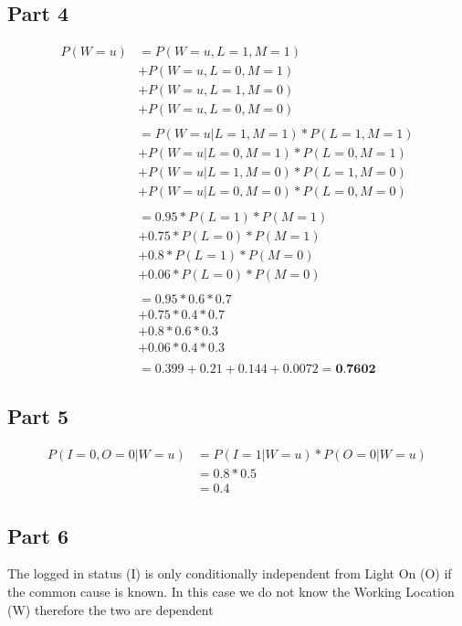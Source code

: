 \documentclass[a4paper, 12pt]{article}
\begin{document}
		\subsection{Part 4}
			\begin{equation*}
				\begin{split}
					P(W=u) & = P(W=u,L=1,M=1)
					\\
					& + P(W=u,L=0,M=1)
					\\
					& + P(W=u,L=1,M=0)
					\\
					& + P(W=u,L=0,M=0)
					\\\\
					& = P(W=u|L=1,M=1)*P(L=1,M=1)
					\\
					& + P(W=u|L=0,M=1)*P(L=0,M=1)
					\\
					& + P(W=u|L=1,M=0)*P(L=1,M=0)
					\\
					& + P(W=u|L=0,M=0)*P(L=0,M=0)
					\\\\
					& = 0.95 * P(L=1) * P(M=1)
					\\
					& + 0.75 * P(L=0) * P(M=1)
					\\
					& + 0.8 * P(L=1) * P(M=0)
					\\
					& + 0.06 * P(L=0) * P(M=0)
					\\\\
					& = 0.95 * 0.6 * 0.7
					\\
					& + 0.75 * 0.4 * 0.7
					\\
					& + 0.8 * 0.6 * 0.3
					\\
					& + 0.06 * 0.4 * 0.3
					\\\\
					& = 0.399 + 0.21 + 0.144 + 0.0072 = \textbf{0.7602}
				\end{split}
			\end{equation*}
			
		\subsection{Part 5}
			\begin{equation}
				\begin{split}
					P(I=0,O=0|W=u) & = P(I=1|W=u) * P(O=0|W=u)
					\\
					& = 0.8 * 0.5
					\\
					& = 0.4
				\end{split}
			\end{equation}
			
		\subsection{Part 6}
			The logged in status (I) is only conditionally independent from Light On (O) if the common cause is known. In this case we do not know the Working Location (W) therefore the two are dependent			
	
\end{document}
